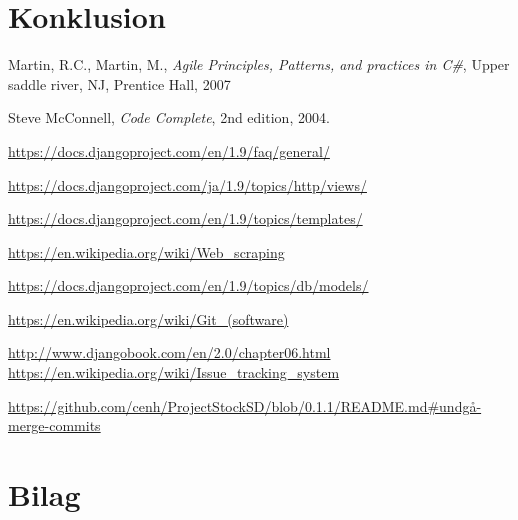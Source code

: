 \documentclass[12pt]{article}
\begin{document}
\newpage
\section{Konklusion}
\label{sec:konklusion}

\newpage
\begin{thebibliography}{9}

	Martin, R.C., Martin, M.,
	\emph{Agile Principles, Patterns, and practices in C\#},
	Upper saddle river, NJ, Prentice Hall,
	2007

	Steve McConnell,
	\emph{Code Complete},
	2nd edition,
	2004.

	\url{https://docs.djangoproject.com/en/1.9/faq/general/}

	\url{https://docs.djangoproject.com/ja/1.9/topics/http/views/}

	\url{https://docs.djangoproject.com/en/1.9/topics/templates/}

    \url{https://en.wikipedia.org/wiki/Web_scraping}

    \url{https://docs.djangoproject.com/en/1.9/topics/db/models/}

    \url{https://en.wikipedia.org/wiki/Git_(software)}

    \url{http://www.djangobook.com/en/2.0/chapter06.html}
    \url{https://en.wikipedia.org/wiki/Issue_tracking_system}

    \url{https://github.com/cenh/ProjectStockSD/blob/0.1.1/README.md#undgå-merge-commits}

\end{thebibliography}

\newpage
\section{Bilag}
\label{sec:bilag}
\end{document}
